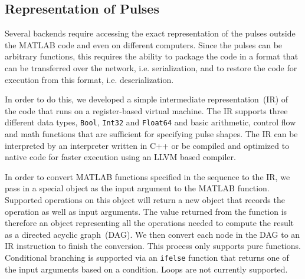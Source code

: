 \subsection{Representation of Pulses}
\label{ch:computer-control:backend:pulse-repr}
Several backends require accessing the exact representation of the pulses
outside the MATLAB code and even on different computers.
Since the pulses can be arbitrary functions,
this requires the ability to package the code in a format
that can be transferred over the network, i.e. serialization,
and to restore the code for execution from this format, i.e. deserialization.

In order to do this, we developed a simple intermediate representation~(IR)
of the code that runs on a register-based virtual machine.
The IR supports three different data types, \verb`Bool`, \verb`Int32` and \verb`Float64`
and basic arithmetic, control flow and math functions
that are sufficient for specifying pulse shapes.
The IR can be interpreted by an interpreter written in C++ or
be compiled and optimized to native code for faster execution using an LLVM based compiler.

In order to convert MATLAB functions specified in the sequence to the IR,
we pass in a special object as the input argument to the MATLAB function.
Supported operations on this object will return a new object
that records the operation as well as input arguments.
The value returned from the function is therefore an object representing
all the operations needed to compute the result as a directed acyclic graph~(DAG).
We then convert each node in the DAG to an IR instruction to finish the conversion.
This process only supports pure functions.
Conditional branching is supported via an \verb`ifelse` function
that returns one of the input arguments based on a condition.
Loops are not currently supported.

